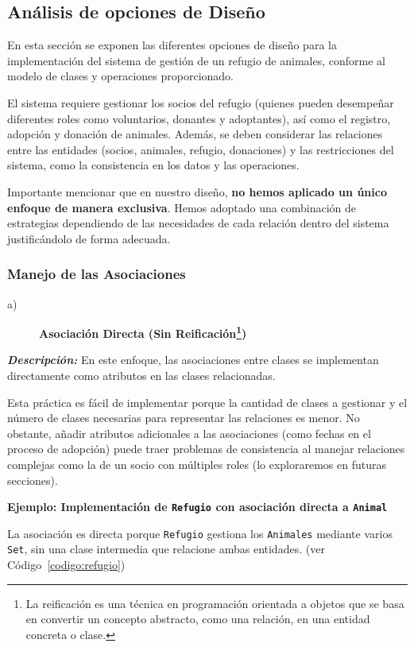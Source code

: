 \subsection{Análisis de opciones de Diseño}
En esta sección se exponen las diferentes opciones de diseño para la implementación 
del sistema de gestión de un refugio de animales, conforme al modelo de clases y 
operaciones proporcionado.\par
\vspace{0.15cm}
El sistema requiere gestionar los socios del refugio (quienes pueden desempeñar 
diferentes roles como voluntarios, donantes y adoptantes), así como el registro, 
adopción y donación de animales. Además, se deben considerar las relaciones entre 
las entidades (socios, animales, refugio, donaciones) y las restricciones del sistema, 
como la consistencia en los datos y las operaciones.\par
\vspace{0.15cm}
Importante mencionar que en nuestro diseño, \textbf{no hemos aplicado un único enfoque de manera 
exclusiva}. Hemos adoptado una combinación de estrategias dependiendo de las necesidades de 
cada relación dentro del sistema justificándolo de forma adecuada.

\subsubsection{Manejo de las Asociaciones}

\begin{description}
    \item[a)] \textbf{Asociación Directa (Sin Reificación\footnote{
        La reificación es una técnica en programación 
        orientada a objetos que se basa en convertir un 
        concepto abstracto, como una relación, en una 
        entidad concreta o clase.})}
\end{description}

\textit{\textbf{Descripción:}}  
En este enfoque, las asociaciones entre clases se implementan directamente como atributos 
en las clases relacionadas.\par
\vspace{0.15cm}
Esta práctica es fácil de implementar porque la cantidad de clases a gestionar 
y el número de clases necesarias para representar las relaciones es menor. No obstante, 
añadir atributos adicionales a las asociaciones (como fechas en el proceso 
de adopción) puede traer problemas de consistencia al manejar relaciones complejas como la 
de un socio con múltiples roles (lo exploraremos en futuras secciones).\par
\newpage %
\textbf{Ejemplo: Implementación de \texttt{Refugio} con asociación directa a \texttt{Animal}}\par
La asociación es directa porque \texttt{Refugio} gestiona los \texttt{Animales} mediante varios 
\texttt{Set}, sin una clase intermedia que relacione ambas entidades. (ver Código~\ref{codigo:refugio})\par

